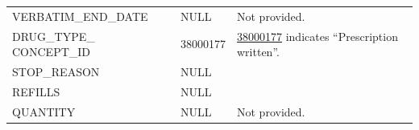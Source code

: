 \documentclass[10.5pt]{book}
\theoremstyle{definition}
\theoremstyle{definition}
\theoremstyle{definition}
\theoremstyle{remark}
\begin{document}
\begin{longtable}[]{@{}lll@{}}
\begin{minipage}[t]{0.28\columnwidth}\raggedright\strut
VERBATIM\_END\_DATE\strut
\end{minipage} & \begin{minipage}[t]{0.16\columnwidth}\raggedright\strut
NULL\strut
\end{minipage} & \begin{minipage}[t]{0.48\columnwidth}\raggedright\strut
Not provided.\strut
\end{minipage}\tabularnewline
\begin{minipage}[t]{0.28\columnwidth}\raggedright\strut
DRUG\_TYPE\_ CONCEPT\_ID\strut
\end{minipage} & \begin{minipage}[t]{0.16\columnwidth}\raggedright\strut
38000177\strut
\end{minipage} & \begin{minipage}[t]{0.48\columnwidth}\raggedright\strut
\href{http://athena.ohdsi.org/search-terms/terms/38000177}{38000177}
indicates ``Prescription written''.\strut
\end{minipage}\tabularnewline
\begin{minipage}[t]{0.28\columnwidth}\raggedright\strut
STOP\_REASON\strut
\end{minipage} & \begin{minipage}[t]{0.16\columnwidth}\raggedright\strut
NULL\strut
\end{minipage} & \begin{minipage}[t]{0.48\columnwidth}\raggedright\strut
\strut
\end{minipage}\tabularnewline
\begin{minipage}[t]{0.28\columnwidth}\raggedright\strut
REFILLS\strut
\end{minipage} & \begin{minipage}[t]{0.16\columnwidth}\raggedright\strut
NULL\strut
\end{minipage} & \begin{minipage}[t]{0.48\columnwidth}\raggedright\strut
\strut
\end{minipage}\tabularnewline
\begin{minipage}[t]{0.28\columnwidth}\raggedright\strut
QUANTITY\strut
\end{minipage} & \begin{minipage}[t]{0.16\columnwidth}\raggedright\strut
NULL\strut
\end{minipage} & \begin{minipage}[t]{0.48\columnwidth}\raggedright\strut
Not provided.\strut

\end{minipage}
\end{longtable}
\end{document}

